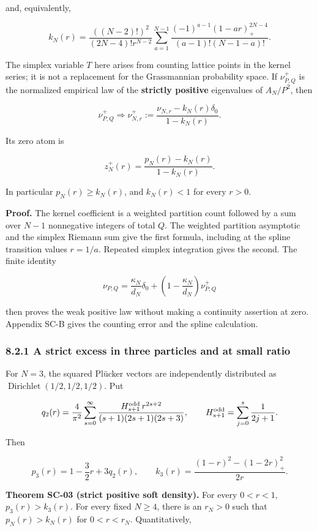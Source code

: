 \documentclass[a4paper,11pt]{article}
\numberwithin{equation}{section}
\begin{document}
and, equivalently,

\[
k_N(r)=\frac{((N-2)!)^2}{(2N-4)!r^{N-2}}
\sum_{a=1}^{N-1}
\frac{(-1)^{a-1}(1-ar)_+^{2N-4}}{(a-1)!(N-1-a)!}.
\]

The simplex variable \(T\) here arises from counting lattice points in the kernel series; it is not a replacement for the Grassmannian probability space. If \(\nu^+_{P,Q}\) is the normalized empirical law of the \textbf{strictly positive} eigenvalues of \(A_N/P^2\), then

\[
\nu^+_{P,Q}\Longrightarrow
\nu^+_{N,r}:=\frac{\nu_{N,r}-k_N(r)\delta_0}{1-k_N(r)}.
\]

Its zero atom is

\[
z_N^+(r)=\frac{p_N(r)-k_N(r)}{1-k_N(r)}.
\]

In particular \(p_N(r)\geq k_N(r)\), and \(k_N(r)<1\) for every \(r>0\).

\textbf{Proof.} The kernel coefficient is a weighted partition count followed by a sum over \(N-1\) nonnegative integers of total \(Q\). The weighted partition asymptotic and the simplex Riemann sum give the first formula, including at the spline transition values \(r=1/a\). Repeated simplex integration gives the second. The finite identity

\[
\nu_{P,Q}=\frac{\kappa_N}{d_N}\delta_0+
\left(1-\frac{\kappa_N}{d_N}\right)\nu^+_{P,Q}
\]

then proves the weak positive law without making a continuity assertion at zero. Appendix SC-B gives the counting error and the spline calculation.

\hypertarget{a-strict-excess-in-three-particles-and-at-small-ratio}{%
\subsubsection{8.2.1 A strict excess in three particles and at small ratio}\label{a-strict-excess-in-three-particles-and-at-small-ratio}}

For \(N=3\), the squared Plücker vectors are independently distributed as \(\operatorname{Dirichlet}(1/2,1/2,1/2)\). Put

\[
q_2(r)=\frac4{\pi^2}\sum_{s=0}^{\infty}
\frac{H_{s+1}^{\rm odd}\,r^{2s+2}}{(s+1)(2s+1)(2s+3)},\qquad
H_{s+1}^{\rm odd}=\sum_{j=0}^{s}\frac1{2j+1}.
\]

Then

\[
p_3(r)=1-\frac32r+3q_2(r),\qquad
k_3(r)=\frac{(1-r)^2-(1-2r)_+^2}{2r}.
\]

\textbf{Theorem SC-03 (strict positive soft density).} For every \(0<r<1\), \(p_3(r)>k_3(r)\). For every fixed \(N\geq4\), there is an \(r_N>0\) such that \(p_N(r)>k_N(r)\) for \(0<r<r_N\). Quantitatively,
\end{document}
